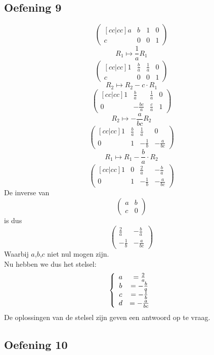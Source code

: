 \documentclass[lineaire_algebra_oplossingen.tex]{subfiles}
\begin{document}
\subsection{Oefening 9}

\[
\begin{pmatrix}[cc|cc]
a & b & 1 & 0\\
c & 0 & 0 & 1
\end{pmatrix}
\]
\[ R_1 \longmapsto \frac{1}{a} R_1 \]
\[
\begin{pmatrix}[cc|cc]
1 & \frac{b}{a} & \frac{1}{a} & 0\\
c & 0 & 0 & 1
\end{pmatrix}
\]
\[ R_2 \longmapsto R_2 - c \cdot R_1\]
\[
\begin{pmatrix}[cc|cc]
1 & \frac{b}{a} & \frac{1}{a} & 0\\
0 & -\frac{bc}{a} & \frac{c}{a} & 1
\end{pmatrix}
\]
\[ R_2 \longmapsto -\frac{a}{bc} R_2 \]
\[
\begin{pmatrix}[cc|cc]
1 & \frac{b}{a} & \frac{1}{a} & 0\\
0 & 1 & -\frac{1}{b} & -\frac{a}{bc}
\end{pmatrix}
\]
\[ R_1 \longmapsto R_1 - \frac{b}{a} \cdot R_2\]
\[
\begin{pmatrix}[cc|cc]
1 & 0 & \frac{2}{a} & -\frac{b}{a}\\
0 & 1 & -\frac{1}{b} & -\frac{a}{bc}
\end{pmatrix}
\]
De inverse van 
\[
\begin{pmatrix}
a & b\\
c & 0
\end{pmatrix}
\]
is dus
\[
\begin{pmatrix}
\frac{2}{a} & -\frac{b}{a}\\
-\frac{1}{b} & -\frac{a}{bc}
\end{pmatrix}
\]
Waarbij $a$,$b$,$c$ niet nul mogen zijn.\\
Nu hebben we dus het stelsel:
\[
\left\lbrace
\begin{array}{c c}
a &= \frac{2}{a}\\
b &= -\frac{b}{a}\\
c &= -\frac{1}{b}\\
d &= -\frac{a}{bc}
\end{array}
\right.
\]
De oplossingen van de stelsel zijn geven een antwoord op te vraag.

\subsection{Oefening 10}
\end{document}
